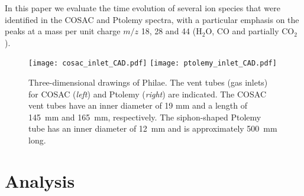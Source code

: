 \documentclass{aa}
\begin{document}

In this paper we evaluate the time evolution 
of several ion species that were identified in the COSAC and Ptolemy spectra, with a particular emphasis on the peaks at a mass per unit charge
 $m/z$ 18, 28 and 44 ($\mathrm{H_2O}$, CO and partially $\mathrm{CO_2}$). 



\begin{figure*}
   \centering
  \hspace{-9mm}
\texttt{[image: cosac\_inlet\_CAD.pdf]}
\hspace{-8mm}
\texttt{[image: ptolemy\_inlet\_CAD.pdf]}
\caption[]{
Three-dimensional drawings of Philae. The vent tubes (gas inlets) for COSAC ({\em left}) and Ptolemy ({\em right}) are indicated. The COSAC vent tubes have an inner diameter of 19 mm and a length of 145~mm and 165~mm, respectively. The 
siphon-shaped Ptolemy tube has an inner diameter of 12~mm and is approximately 500~mm long. 
}
\label{fig_phil}
\end{figure*}



\section{Analysis}

\label{sec_analysis}
\end{document}

